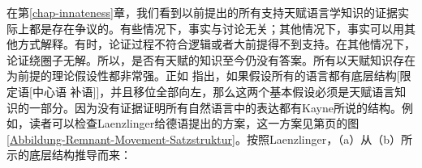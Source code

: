 在第\ref{chap-innateness}章，我们看到以前提出的所有支持天赋语言学知识的证据实际上都是存在争议的。有些情况下，事实与讨论无关；其他情况下，事实可以用其他方式解释。有时，论证过程不符合逻辑或者大前提得不到支持。在其他情况下，论证绕圈子无解。所以，是否有天赋的知识至今仍没有答案。所有以天赋知识存在为前提的理论假设性都非常强。正如 \citet{Kayne94a-u}指出，如果假设所有的语言都有底层结构[限定语[中心语 补语]]，并且移位全部向左，那么这两个基本假设必须是天赋语言知识的一部分。因为没有证据证明所有自然语言中的表达都有Kayne所说的结构。例如，读者可以检查Laenzlinger\citeyearpar[]{Laenzlinger2004a}给德语提出的方案，这一方案见第\pageref{Abbildung-Remnant-Movement-Satzstruktur}页的图\ref{Abbildung-Remnant-Movement-Satzstruktur}。按照Laenzlinger，（a）从（b）所示的底层结构推导而来：
\eal
{}
